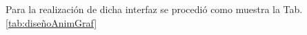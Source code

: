Para la realización de dicha interfaz se procedió como muestra la Tab.
\ref{tab:diseñoAnimGraf}
%     
